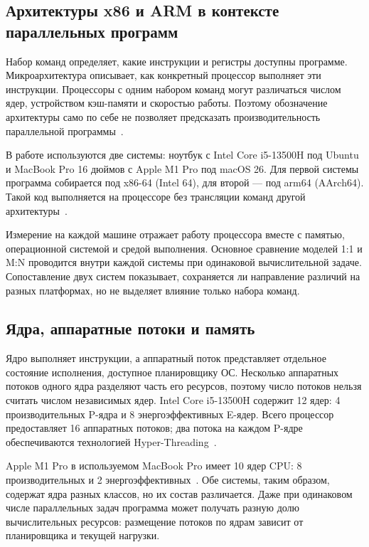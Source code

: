 \subsection{Архитектуры x86 и ARM в контексте параллельных программ}
\label{subsec:isa}

Набор команд определяет, какие инструкции и регистры доступны программе. Микроархитектура
  описывает, как конкретный процессор выполняет эти инструкции. Процессоры с одним набором команд
  могут различаться числом ядер, устройством кэш-памяти и скоростью работы. Поэтому обозначение
  архитектуры само по себе не позволяет предсказать производительность параллельной
  программы~\cite{intel_sdm,arm_a64_isa}.

В работе используются две системы: ноутбук с Intel Core i5-13500H под Ubuntu и MacBook Pro
  16 дюймов с Apple M1 Pro под macOS 26. Для первой системы программа собирается под x86-64
  (Intel 64), для второй — под arm64 (AArch64). Такой код выполняется на процессоре без
  трансляции команд другой архитектуры~\cite{intel_sdm,arm_a64_isa,apple_arm64_docs}.

Измерение на каждой машине отражает работу процессора вместе с памятью, операционной системой и
  средой выполнения. Основное сравнение моделей 1:1 и M:N проводится внутри каждой системы при
  одинаковой вычислительной задаче. Сопоставление двух систем показывает, сохраняется ли направление
  различий на разных платформах, но не выделяет влияние только набора команд.


\subsection{Ядра, аппаратные потоки и память}
\label{subsec:hardware-resources}

Ядро выполняет инструкции, а аппаратный поток представляет отдельное состояние исполнения,
  доступное планировщику ОС. Несколько аппаратных потоков одного ядра разделяют часть его ресурсов,
  поэтому число потоков нельзя считать числом независимых ядер. Intel Core i5-13500H содержит
  12 ядер: 4 производительных P-ядра и 8 энергоэффективных E-ядер. Всего процессор предоставляет
  16 аппаратных потоков; два потока на каждом P-ядре обеспечиваются технологией
  Hyper-Threading~\cite{intel_i513500h,intel_hybrid_arch}.

Apple M1 Pro в используемом MacBook Pro имеет 10 ядер CPU: 8 производительных и
  2 энергоэффективных~\cite{apple_m1pro_specs}. Обе системы, таким образом, содержат ядра разных
  классов, но их состав различается. Даже при одинаковом числе параллельных задач программа может
  получать разную долю вычислительных ресурсов: размещение потоков по ядрам зависит от планировщика
  и текущей нагрузки.

